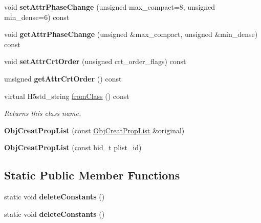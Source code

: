 \begin{DoxyCompactItemize}
\item 
\mbox{\label{class_h5_1_1_obj_creat_prop_list_ab13496855d98c16dce84651c2699a387}} 
void {\bfseries set\+Attr\+Phase\+Change} (unsigned max\+\_\+compact=8, unsigned min\+\_\+dense=6) const
\item 
\mbox{\label{class_h5_1_1_obj_creat_prop_list_a59f73f911416e2b7729f625ac640e7cd}} 
void {\bfseries get\+Attr\+Phase\+Change} (unsigned \&max\+\_\+compact, unsigned \&min\+\_\+dense) const
\item 
\mbox{\label{class_h5_1_1_obj_creat_prop_list_ad092706f141a7b9cc7eea74bef75344e}} 
void {\bfseries set\+Attr\+Crt\+Order} (unsigned crt\+\_\+order\+\_\+flags) const
\item 
\mbox{\label{class_h5_1_1_obj_creat_prop_list_af12042cacf15023ecc0b0f1e2ad621cd}} 
unsigned {\bfseries get\+Attr\+Crt\+Order} () const
\item 
\mbox{\label{class_h5_1_1_obj_creat_prop_list_aa9e5e054947c19ae8eaab5e4e938fc2c}} 
virtual H5std\+\_\+string \hyperlink{class_h5_1_1_obj_creat_prop_list_aa9e5e054947c19ae8eaab5e4e938fc2c}{from\+Class} () const
\begin{DoxyCompactList}\small\item\em Returns this class name. \end{DoxyCompactList}\item 
\mbox{\label{class_h5_1_1_obj_creat_prop_list_a209b2314987f497c89d7ce47577aa88f}} 
{\bfseries Obj\+Creat\+Prop\+List} (const \hyperlink{class_h5_1_1_obj_creat_prop_list}{Obj\+Creat\+Prop\+List} \&original)
\item 
\mbox{\label{class_h5_1_1_obj_creat_prop_list_a54856cf6703377c66340303a3a8442c3}} 
{\bfseries Obj\+Creat\+Prop\+List} (const hid\+\_\+t plist\+\_\+id)
\end{DoxyCompactItemize}
\subsection*{Static Public Member Functions}
\begin{DoxyCompactItemize}
\item 
\mbox{\label{class_h5_1_1_obj_creat_prop_list_ab237bf8ad78f7605e5d3361d7c999fcf}} 
static void {\bfseries delete\+Constants} ()
\item 
\mbox{\label{class_h5_1_1_obj_creat_prop_list_ab237bf8ad78f7605e5d3361d7c999fcf}} 
static void {\bfseries delete\+Constants} ()
\end{DoxyCompactItemize}
